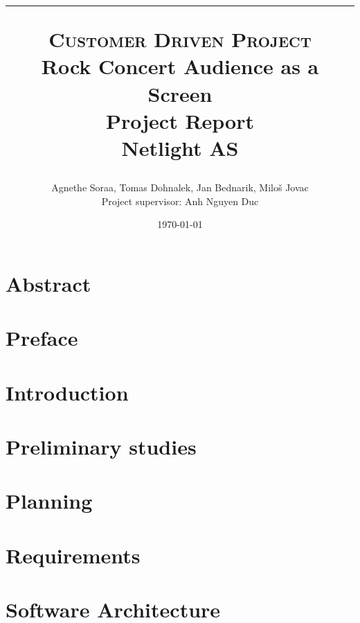 \documentclass[11pt]{report}
\title{
	\hrule
    \normalsize \textsc{Customer Driven Project}\\
    \Huge Rock Concert Audience as a Screen\\[10pt]
    \normalsize Project Report\\[10pt]
    Netlight AS
    \horrule{2pt}
    }
\author{Agnethe Soraa,
Tomas Dohnalek,
Jan Bednarik,
Miloš Jovac \\
\normalsize Project supervisor: Anh Nguyen Duc}
\date{\today}
\begin{document}
\maketitle

\setcounter{page}{2}
\chapter*{Abstract}


\chapter*{Preface}


\tableofcontents



\listoffigures
\listoftables

\chapter{Introduction}
\setcounter{page}{1}


\chapter{Preliminary studies}


\chapter{Planning} \label{txt:planning}


\chapter{Requirements}


%

\chapter{Software Architecture}

\end{document}
